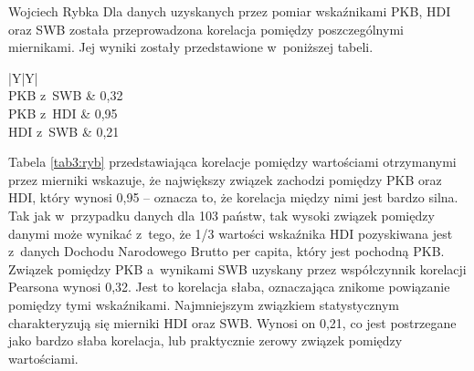 \begin{artplenv}{Wojciech Rybka}
Dla danych uzyskanych przez pomiar wskaźnikami PKB, HDI oraz SWB została przeprowadzona korelacja pomiędzy
poszczególnymi miernikami. Jej wyniki zostały przedstawione w~poniższej tabeli. 

\captionsetup[table]{name=Tabela}
\begin{table}[H]
	\begin{tabularx}{\textwidth}{|Y|Y|}
		\hline
		\\\hline
		PKB z~SWB &
		0,32\\\hline
		PKB z~HDI &
		0,95\\\hline
		HDI z~SWB &
		0,21\\\hline
	\end{tabularx}
	
	\caption{Wartości związku pomiędzy poszczególnymi wskaźnikami dla Polski.
		Źródło: opracowanie własne na podstawie
		\parencite{international_monetary_fund_world_2019a,united_nations_development_programme_human_2019,noauthor_world_2018}.
		}
	\label{tab3:ryb}
\end{table}


%

Tabela \ref{tab3:ryb} przedstawiająca korelacje pomiędzy wartościami otrzymanymi przez mierniki wskazuje, że największy związek
zachodzi pomiędzy PKB oraz HDI, który wynosi 0,95 -- oznacza to, że korelacja między nimi jest bardzo silna. Tak
jak w~przypadku danych dla 103 państw, tak wysoki związek pomiędzy danymi może wynikać z~tego, że 1/3 wartości wskaźnika HDI
pozyskiwana jest z~danych Dochodu Narodowego Brutto per capita, który jest pochodną PKB. Związek pomiędzy
PKB a~wynikami SWB uzyskany przez współczynnik korelacji Pearsona wynosi 0,32. Jest to korelacja słaba, oznaczająca znikome
powiązanie pomiędzy tymi wskaźnikami. Najmniejszym związkiem statystycznym charakteryzują się mierniki HDI oraz SWB.
Wynosi on 0,21, co jest postrzegane jako bardzo słaba korelacja, lub praktycznie zerowy związek pomiędzy wartościami. 


\end{artplenv}
